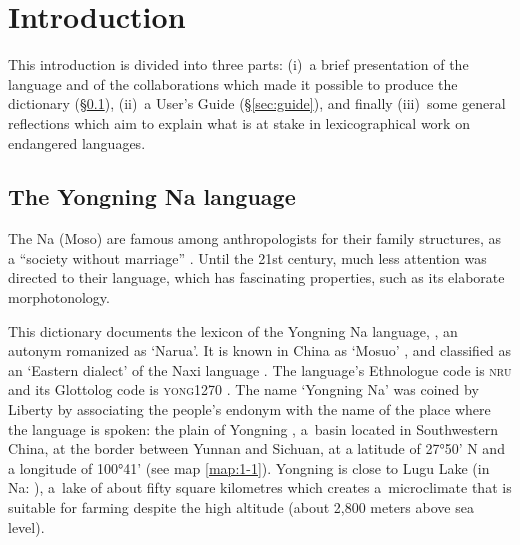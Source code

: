\langueeng

\chapter*{Introduction}


This introduction is divided into three parts: (i)~a brief presentation of the language and of the collaborations which made it possible to produce the dictionary (§\ref{sec:lang}), (ii)~a User's Guide (§\ref{sec:guide}), and finally (iii)~some general reflections which aim to explain what is at stake in lexicographical work on endangered languages.


\section{The Yongning Na language}
\label{sec:lang}

The Na (Moso) are famous among anthropologists for their family structures, as a “society without marriage” \parencite{cai1997,wellens2003,milan_tourisme_2019}. Until the 21st century, much less attention was directed to their language, which has fascinating properties, such as its elaborate morphotonology.

This dictionary documents the lexicon of the Yongning Na language, , an autonym romanized as ‘Narua’\parencite{dobbs_ortho_2018}. It is known in China as ‘Mosuo’ , and classified as an ‘Eastern dialect’ of the Naxi language \parencite[107]{heetal1985}. The language’s Ethnologue code is \textsc{nru} \parencite{lewisetal2016} and its Glottolog code is \textsc{yong1270} \parencite{Nordhoff2012}. The name ‘Yongning Na’ was coined by Liberty \textcite{lidz2006} by associating the people's {endonym} with the name of the place where the language is spoken:
the plain of Yongning , a~basin located in Southwestern China, at the border between Yunnan and Sichuan, at a latitude of 27°50’ N and a longitude of 100°41’ (see map \ref{map:1-1}). Yongning is close to Lugu Lake  (in Na: ), a~lake of about fifty square kilometres which creates a~microclimate that is suitable for farming despite the high altitude (about 2,800 meters above sea level).

